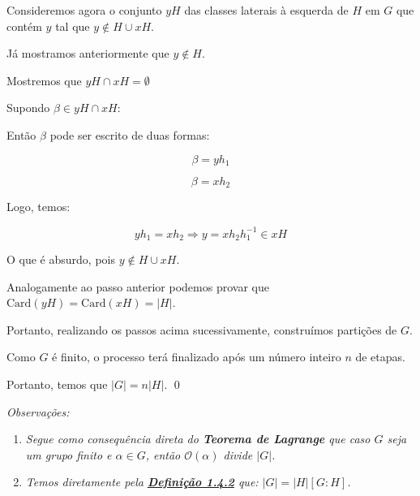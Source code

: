 \documentclass[16pt,openany]{book}
\theoremstyle{definition}
\begin{document}
Consideremos agora o conjunto $yH$ das classes laterais à esquerda de $H$ em $G$ que contém $y$ tal que $y \notin H\cup xH$.

Já mostramos anteriormente que $y \notin H$.

Mostremos que $yH \cap xH = \emptyset$

Supondo $\beta \in yH \cap xH$:

Então $\beta$ pode ser escrito de duas formas:

\[
\beta = yh_1
\]

\[
\beta = xh_2
\]

Logo, temos:

\[
yh_1 = xh_2 \Longrightarrow y = xh_2h_1^{-1} \in xH
\]

O que é absurdo, pois $y \notin H\cup xH$.

Analogamente ao passo anterior podemos provar que $\text{Card}(yH) = \text{Card}(xH) = \vert H\vert$.

Portanto, realizando os passos acima sucessivamente, construímos partições de $G$.

Como $G$ é finito, o processo terá finalizado após um número inteiro $n$ de etapas.

Portanto, temos que $\vert G\vert = n\vert H\vert$. \qed

\textit{Observações:} 

\begin{enumerate}
	\item \textit{Segue como consequência direta do \textbf{Teorema de Lagrange} que caso $G$ seja um grupo finito e $\alpha \in G$, então $\mathcal{O}(\alpha)$ divide $\vert G\vert$.}
	\item \textit{Temos diretamente pela \hyperlink{def142}{\textbf{Definição 1.4.2}} que: $\vert G\vert = \vert H\vert [G:H]$.}
\end{enumerate}
\end{document}

